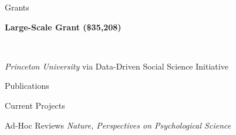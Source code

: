 \documentclass{cv} %
\begin{document}
\begin{cvSection}{Grants}
\begin{minipage}[t]{0.80\linewidth}
    \raggedright \textbf{Large-Scale Grant (\$35,208)}%
\end{minipage}
\hfill
\begin{minipage}[t]{0.15\linewidth}
\end{minipage}
\\
\begin{minipage}[t]{0.80\linewidth}
    \raggedright \textit{Princeton University} via Data-Driven Social Science Initiative%
\end{minipage}
\hfill
\begin{minipage}[t]{0.15\linewidth}
\end{minipage}

\end{cvSection}


\begin{cvSectionEmpty}{Publications}
    \printbibliography[
        heading=none,
        keyword=publications
    ]
\end{cvSectionEmpty}

\begin{cvSectionEmpty}{Current Projects}
    \printbibliography[
        heading=none,
        keyword=in-prep
    ]
\end{cvSectionEmpty}

\begin{cvSectionEmpty}{Ad-Hoc Reviews}
\textit{Nature, Perspectives on Psychological Science}
\end{cvSectionEmpty}

\newpage

\end{document}
